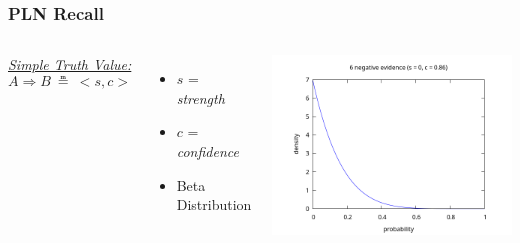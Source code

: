 \documentclass[aspectratio=169]{beamer}
\newcommand{\limp}{\Rightarrow}
\newcommand{\STV}[2]{<\!#1, #2\!>}
\begin{document}
\begin{frame}
  \frametitle{PLN Recall}
  \begin{columns}
    \column{5cm}
    \underline{\emph{Simple Truth Value:}}
    $$A \limp B\ \measeq\ \STV{s}{c}$$
    \begin{itemize}
    \item $s$ = \emph{strength}
    \item $c$ = \emph{confidence}
    \item Beta Distribution
    \end{itemize}
    \column{10cm}
    \includegraphics[scale=0.4]{figs/observations_6_0.png}
  \end{columns}
\end{frame}
\end{document}
